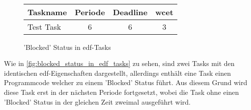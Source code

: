 \documentclass[../EDF Master Thesis.tex]{subfiles}
\begin{document}
\begin{figure}[H]
\\

        \vspace {0.5cm}
        \begin{tabular}{l|c|c|c}
            Taskname & Periode & Deadline & \ac{wcet} \\
            \hline
            Test Task & 6 & 6 & 3 \\
        \end{tabular}
        \caption{'Blocked' Status in \ac{edf}-Tasks}
        \label{fig:blocked_status_in_edf_tasks}
    \end{figure}

    Wie in \autoref{fig:blocked_status_in_edf_tasks} zu sehen, sind zwei Tasks mit den identischen \ac{edf}-Eigenschaften dargestellt, allerdings enthält eine Task einen Programmcode welcher zu einem 'Blocked' Status führt.
    Aus diesem Grund wird diese Task erst in der nächsten Periode fortgesetzt, wobei die Task ohne einen 'Blocked' Status in der gleichen Zeit zweimal ausgeführt wird.
\end{document}
